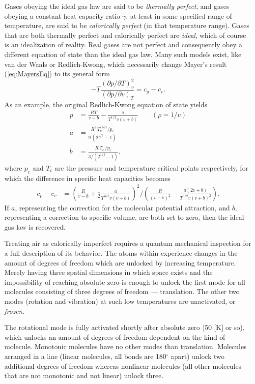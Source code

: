 \documentclass[11pt,dvipsnames]{thesis}
\begin{document}
Gases obeying the ideal gas law are said to be \textit{thermally perfect}, and gases obeying a constant heat capacity ratio $\gamma$, at least in some specified range of temperature, are said to be \textit{calorically perfect} (in that temperature range). Gases that are both thermally perfect and calorically perfect are \textit{ideal}, which of course is an idealization of reality. Real gases are not perfect and consequently obey a different equation of state than the ideal gas law. Many such models exist, like van der Waals or Redlich-Kwong, which necessarily change Mayer's result (\ref{eq:MayersEq}) to its general form
\begin{equation}
-T \frac{(\partial p / \partial T)_v^2}{(\partial p / \partial v)_T} = c_p - c_v.
\end{equation}
As an example, the original Redlich-Kwong equation of state yields
\begin{align}
p &= \frac{RT}{v - b} - \frac{a}{T^{1/2} v (v + b)} \qquad (\rho = 1 / v) \\
a &= \frac{R^2 \,{T_c}^{\!5/2} / p_c}{9\,(2^{1/3} - 1)} \\
b &= \frac{R \,T_c \,/ p_c}{3 / (2^{1/3} - 1)},
\end{align}
where $p_c$ and $T_c$ are the pressure and temperature critical points respectively,
for which the difference in specific heat capacities becomes
\begin{align}
c_p - c_v &= \left(\frac{R}{v - b} + \frac{1}{2}\frac{a}{T^{3/2} v (v+b)}\right)^{\!2} / \left(\frac{R}{(v - b)^2} - \frac{a (2v + b)}{T^{3/2} v (v + b)^2}\right).
\end{align}
If $a$, representing the correction for the molecular potential attraction, and $b$, representing a correction to specific volume, are both set to zero, then the ideal gas law is recovered.

Treating air as calorically imperfect requires a quantum mechanical inspection for a full description of its behavior. The atoms within experience changes in the amount of degrees of freedom which are unlocked by increasing temperature. Merely having three spatial dimensions in which space exists and the impossibility of reaching absolute zero is enough to unlock the first mode for all molecules consisting of three degrees of freedom  --- translation. The other two modes (rotation and vibration) at such low temperatures are unactivated, or \textit{frozen}. 

The rotational mode is fully activated shortly after absolute zero (50 [\si{\K}] or so), which unlocks an amount of degrees of freedom dependent on the kind of molecule.
%
Monotonic molecules have no other modes than translation. Molecules arranged in a line (linear molecules, all bonds are 180$^\circ$ apart) unlock two additional degrees of freedom whereas nonlinear molecules (all other molecules that are not monotonic and not linear) unlock three.
\end{document}
